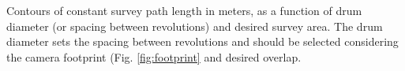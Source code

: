 \label{fig:survey_length} Contours of constant survey path length in meters, as a function of drum diameter (or spacing between revolutions) and desired survey area. The drum diameter sets the spacing between revolutions and should be selected considering the camera footprint (Fig. \ref{fig:footprint} and desired overlap.